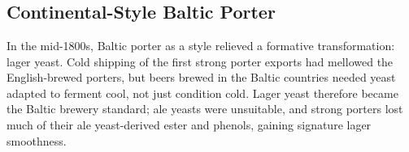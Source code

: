 \documentclass[10pt,oneside]{scrbook}
\begin{document}

\begin{methodandtiming}
 
\begin{mashsteps}
\end{mashsteps}

\end{methodandtiming}

\pagebreak

\begin{ingredientsblock}

\begin{malts}
\end{malts}

\begin{hops}
\end{hops}

\begin{yeasts}
\end{yeasts}

\end{ingredientsblock}

\part{\stylebalticporter}

\chapter*{Continental-Style Baltic Porter}

\begin{aboutblock}
In the mid-1800s, Baltic porter as a style relieved a formative transformation:
lager yeast. Cold shipping of the first strong porter exports had mellowed the
English-brewed porters, but beers brewed in the Baltic countries needed yeast
adapted to ferment cool, not just condition cold. Lager yeast therefore became
the Baltic brewery standard; ale yeasts were unsuitable, and strong porters
lost much of their ale yeast-derived ester and phenols, gaining signature
lager smoothness.
\end{aboutblock}

\end{document}
